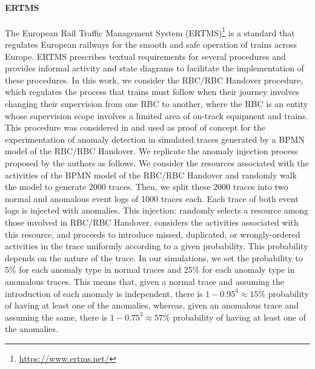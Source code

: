 \paragraph{ERTMS}
The European Rail Traffic Management System (ERTMS)\footnote{\url{https://www.ertms.net/}} is a standard that regulates European railways for the smooth and safe operation of trains across Europe. ERTMS prescribes textual requirements for several procedures and provides informal activity and state diagrams to facilitate the implementation of these procedures. In this work, we consider the RBC/RBC Handover procedure, which regulates the process that trains must follow when their journey involves changing their supervision from one RBC to another, where the RBC is an entity whose supervision scope involves a limited area of on-track equipment and trains. This procedure was considered in \cite{debenedictis2023dtadiiot} and used as proof of concept for the experimentation of anomaly detection in simulated traces generated by a BPMN model of the RBC/RBC Handover. We replicate the anomaly injection process proposed by the authors as follows. We consider the resources associated with the activities of the BPMN model of the RBC/RBC Handover and randomly walk the model to generate 2000 traces. Then, we split these 2000 traces into two normal and anomalous event logs of 1000 traces each. Each trace of both event logs is injected with anomalies. This injection: randomly selects a resource among those involved in RBC/RBC Handover, considers the activities associated with this resource, and proceeds to introduce missed, duplicated, or wrongly-ordered activities in the trace uniformly according to a given probability. This probability depends on the nature of the trace. In our simulations, we set the probability to 5\% for each anomaly type in normal traces and 25\% for each anomaly type in anomalous traces. This means that, given a normal trace and assuming the introduction of each anomaly is independent, there is $1-0.95^3\approx15\%$ probability of having at least one of the anomalies, whereas, given an anomalous trace and assuming the same, there is $1-0.75^3\approx57\%$ probability of having at least one of the anomalies.

